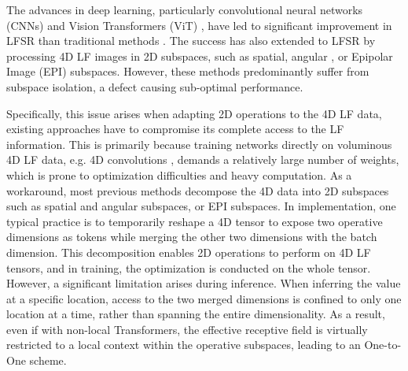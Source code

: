

 The advances in deep learning, particularly convolutional neural networks (CNNs) \cite{yoon2017LFCNN, yeungSAS_LFSR2019, wangDistgSSR_TIP2022} and Vision Transformers (ViT) \cite{dosovitskiyViT_arXiv2020, liuSwin_ICCV2021, luESRT_CVPR2022}, have led to significant improvement in LFSR than traditional methods \cite{wanner2014variational}. The success has also extended to LFSR by processing 4D LF images in 2D subspaces, such as spatial, angular \cite{wangDPT_AAAI2022, liangLFT_SPL2022}, or Epipolar Image (EPI) \cite{liangEPIT_arXiv2023} subspaces. However, these methods predominantly suffer from subspace isolation, a defect causing sub-optimal performance.

Specifically, this issue arises when adapting 2D operations to the 4D LF data, existing approaches have to compromise its complete access to the LF information. This is primarily because training networks directly on voluminous 4D LF data, e.g. 4D convolutions \cite{yeungSAS_LFSR2019}, demands a relatively large number of weights, which is prone to optimization difficulties and heavy computation. As a workaround, most previous methods decompose the 4D data into 2D subspaces such as spatial and angular subspaces, or EPI subspaces. In implementation, one typical practice is to temporarily reshape a 4D tensor to expose two operative dimensions as tokens while merging the other two dimensions with the batch dimension. This decomposition enables 2D operations to perform on 4D LF tensors, and in training, the optimization is conducted on the whole tensor. However, a significant limitation arises during inference. When inferring the value at a specific location, access to the two merged dimensions is confined to only one location at a time, rather than spanning the entire dimensionality. As a result, even if with non-local Transformers, the effective receptive field is virtually restricted to a local context within the operative subspaces, leading to an One-to-One scheme.

